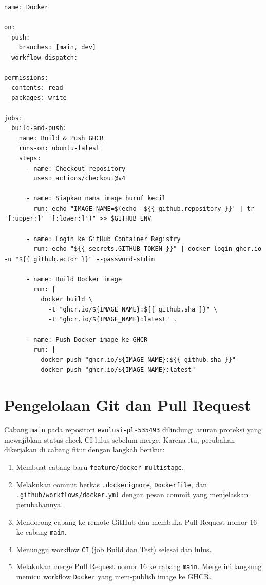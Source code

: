 \documentclass[a4paper,oneside,12pt]{report}
\begin{document}
\begin{lstlisting}[style=yamlstyle,caption={Berkas workflow GitHub Actions \texttt{.github/workflows/docker.yml}.}]
name: Docker

on:
  push:
    branches: [main, dev]
  workflow_dispatch:

permissions:
  contents: read
  packages: write

jobs:
  build-and-push:
    name: Build & Push GHCR
    runs-on: ubuntu-latest
    steps:
      - name: Checkout repository
        uses: actions/checkout@v4

      - name: Siapkan nama image huruf kecil
        run: echo "IMAGE_NAME=$(echo '${{ github.repository }}' | tr '[:upper:]' '[:lower:]')" >> $GITHUB_ENV

      - name: Login ke GitHub Container Registry
        run: echo "${{ secrets.GITHUB_TOKEN }}" | docker login ghcr.io -u "${{ github.actor }}" --password-stdin

      - name: Build Docker image
        run: |
          docker build \
            -t "ghcr.io/${IMAGE_NAME}:${{ github.sha }}" \
            -t "ghcr.io/${IMAGE_NAME}:latest" .

      - name: Push Docker image ke GHCR
        run: |
          docker push "ghcr.io/${IMAGE_NAME}:${{ github.sha }}"
          docker push "ghcr.io/${IMAGE_NAME}:latest"
\end{lstlisting}

\section{Pengelolaan Git dan Pull Request}
Cabang \texttt{main} pada repositori \texttt{evolusi-pl-535493} dilindungi aturan proteksi yang mewajibkan status check CI lulus sebelum merge. Karena itu, perubahan dikerjakan di cabang fitur dengan langkah berikut:
\begin{enumerate}
    \item Membuat cabang baru \texttt{feature/docker-multistage}.
    \item Melakukan commit berkas \texttt{.dockerignore}, \texttt{Dockerfile}, dan \texttt{.github/workflows/docker.yml} dengan pesan commit yang menjelaskan perubahannya.
    \item Mendorong cabang ke remote GitHub dan membuka Pull Request nomor 16 ke cabang \texttt{main}.
    \item Menunggu workflow \texttt{CI} (job Build dan Test) selesai dan lulus.
    \item Melakukan merge Pull Request nomor 16 ke cabang \texttt{main}. Merge ini langsung memicu workflow \texttt{Docker} yang mem-publish image ke GHCR.
\end{enumerate}
\end{document}
